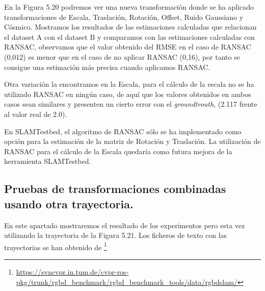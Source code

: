 En la Figura 5.20 podremos ver una nueva transformación donde se ha aplicado transformaciones de Escala, Traslación, Rotación, Offset, Ruido Gaussiano y Cósmico. Mostramos los resultados de las estimaciones calculadas que relacionan el dataset A con el dataset B y comparamos con las estimaciones calculadas con RANSAC, observamos que el valor obtenido del RMSE en el caso de RANSAC (0,012) es menor que en el caso de no aplicar RANSAC (0,16), por tanto se consigue una estimación más precisa cuando aplicamos RANSAC.

Otra variación la encontramos en la Escala, para el cálculo de la escala no se ha utilizado RANSAC en ningún caso, de aquí que los valores obtenidos en ambos casos sean similares y presenten un cierto error con el \textit{groundtrouth}, (2.117 frente al valor real de 2.0). 

En SLAMTestbed, el algoritmo de RANSAC sólo se ha implementado como opción para la estimación de la matriz de Rotación y Traslación.
La utilización de RANSAC para el cálculo de la Escala quedaría como futura mejora de la herramienta SLAMTestbed.


\newpage

\subsection {Pruebas de transformaciones combinadas usando otra trayectoria.}

En este apartado mostraremos el resultado de los experimentos pero esta vez utilizando la trayectoria de la Figura 5.21. Los ficheros de texto con las trayectorias se han obtenido de \footnote{\url{https://svncvpr.in.tum.de/cvpr-ros-pkg/trunk/rgbd_benchmark/rgbd_benchmark_tools/data/rgbdslam/}}

